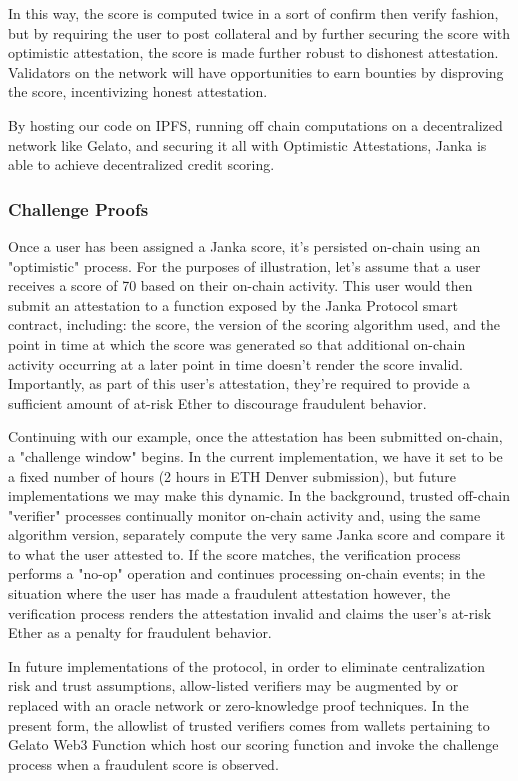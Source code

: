 \documentclass{article}
\begin{document}
In this way, the score is computed twice in a sort of confirm then verify fashion, but by requiring the user to post collateral and by further securing the score with optimistic attestation, the score is made further robust to dishonest attestation. Validators on the network will have opportunities to earn bounties by disproving the score, incentivizing honest attestation. 

By hosting our code on IPFS, running off chain computations on a decentralized network like Gelato, and securing it all with Optimistic Attestations, Janka is able to achieve decentralized credit scoring.

\subsubsection{Challenge Proofs}

Once a user has been assigned a Janka score, it's persisted on-chain using an "optimistic" process. For the purposes of illustration, let's assume that a user receives a score of 70 based on their on-chain activity. This user would then submit an attestation to a function exposed by the Janka Protocol smart contract, including: the score, the version of the scoring algorithm used, and the point in time at which the score was generated so that additional on-chain activity occurring at a later point in time doesn't render the score invalid. Importantly, as part of this user's attestation, they're required to provide a sufficient amount of at-risk Ether to discourage fraudulent behavior.

Continuing with our example, once the attestation has been submitted on-chain, a "challenge window" begins. In the current implementation, we have it set to be a fixed number of hours (2 hours in ETH Denver submission), but future implementations we may make this dynamic. In the background, trusted off-chain "verifier" processes continually monitor on-chain activity and, using the same algorithm version, separately compute the very same Janka score and compare it to what the user attested to. If the score matches, the verification process performs a "no-op" operation and continues processing on-chain events; in the situation where the user has made a fraudulent attestation however, the verification process renders the attestation invalid and claims the user's at-risk Ether as a penalty for fraudulent behavior.

In future implementations of the protocol, in order to eliminate centralization risk and trust assumptions, allow-listed verifiers may be augmented by or replaced with an oracle network or zero-knowledge proof techniques. In the present form, the allowlist of trusted verifiers comes from wallets pertaining to Gelato Web3 Function which host our scoring function and invoke the challenge process when a fraudulent score is observed.
\end{document}
